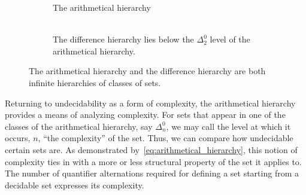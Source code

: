 \begin{figure}
  \centering
  \begin{subfigure}{0.4\textwidth}
    \centering
    \caption{
      The arithmetical hierarchy
      \\\hspace{0pt}\\\hspace{0pt} %
    }
    \label{fig:arithmetical_hierarchy}
  \end{subfigure}
  \qquad
  \begin{subfigure}{0.4\textwidth}
    \centering
    \caption{
      The difference hierarchy lies below the $\Delta^0_2$ level of the arithmetical hierarchy.
    }
    \label{fig:difference_hierarchy}
  \end{subfigure}
  \caption{
    The arithmetical hierarchy and the difference hierarchy are both infinite hierarchies of classes of sets.
  }
\end{figure}

Returning to undecidability as a form of complexity, the arithmetical hierarchy provides a means of analyzing complexity.
For sets that appear in one of the classes of the arithmetical hierarchy, say $\Delta^0_n$, we may call the level at which it occurs, $n$, \enquote{the complexity} of the set.
Thus, we can compare how undecidable certain sets are.
As demonstrated by~\eqref{eq:arithmetical_hierarchy}, this notion of complexity ties in with a more or less structural property of the set it applies to.
The number of quantifier alternations required for defining a set starting from a decidable set expresses its complexity.

